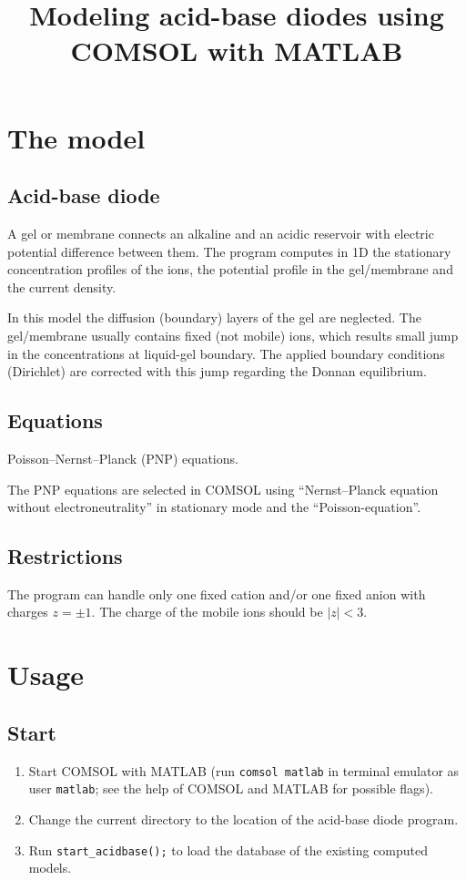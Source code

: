 \documentclass[12pt,a4paper]{article}
\title{Modeling acid-base diodes using COMSOL with MATLAB}
\begin{document}
\maketitle

\section{The model}

\subsection{Acid-base diode}
A gel or membrane connects an alkaline and an acidic reservoir
with electric potential difference between them.
The program computes in 1D the stationary concentration profiles of the ions,
the potential profile in the gel/membrane and the current density.

In this model the diffusion (boundary) layers of the gel are neglected.
The gel/membrane usually contains fixed (not mobile) ions,
which results small jump in the concentrations at liquid-gel boundary.
The applied boundary conditions (Dirichlet) are corrected with this jump
regarding the Donnan equilibrium.

\subsection{Equations}
Poisson--Nernst--Planck (PNP) equations.

The PNP equations are selected in COMSOL using
``Nernst--Planck equation without electroneutrality''
in stationary mode and the ``Poisson-equation''.

\subsection{Restrictions}
The program can handle only one fixed cation and/or one fixed anion
with charges $z=\pm1$. The charge of the mobile ions should be $|z|<3$.

\section{Usage}

\subsection{Start}
\begin{enumerate}
\item Start COMSOL with MATLAB
	(run \verb|comsol matlab| in terminal emulator
	as user \verb|matlab|;
	see the help of COMSOL and MATLAB for possible flags).
\item Change the current directory to
	the location of the acid-base diode program.
\item Run \verb|start_acidbase();| to load the database of
	the existing computed models.
\end{enumerate}
\end{document}
